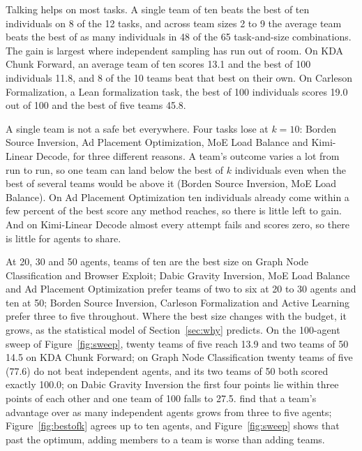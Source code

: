 \documentclass[numbers,10pt]{arxiv}
\renewcommand{\paragraph}[1]{\sansbf{#1}}
\begin{document}
Talking helps on most tasks. A single team of ten beats the best of ten individuals on 8 of the 12 tasks, and across team sizes 2 to 9 the average team beats the best of as many individuals in 48 of the 65 task-and-size combinations. The gain is largest where independent sampling has run out of room. On KDA Chunk Forward, an average team of ten scores 13.1 and the best of 100 individuals 11.8, and 8 of the 10 teams beat that best on their own. On Carleson Formalization, a Lean formalization task, the best of 100 individuals scores 19.0 out of 100 and the best of five teams 45.8.

A single team is not a safe bet everywhere. Four tasks lose at $k=10$: Borden Source Inversion, Ad Placement Optimization, MoE Load Balance and Kimi-Linear Decode, for three different reasons. A team's outcome varies a lot from run to run, so one team can land below the best of $k$ individuals even when the best of several teams would be above it (Borden Source Inversion, MoE Load Balance). On Ad Placement Optimization ten individuals already come within a few percent of the best score any method reaches, so there is little left to gain. And on Kimi-Linear Decode almost every attempt fails and scores zero, so there is little for agents to share.

\begin{table}[htbp]
\caption{One team of ten against the expected best of ten independent agents, and the expected best of five and ten teams of ten against the expected best of 50 and 100 independent agents, on all 12 tasks (Qwen3.8-27B, 12\,h per agent). Team size is $k=10$ throughout. The winner of each pair is bold.}
\label{tab:k10}
\centering\footnotesize

\end{table}

\paragraph{Team size at smaller budgets.} At 20, 30 and 50 agents, teams of ten are the best size on Graph Node Classification and Browser Exploit; Dabic Gravity Inversion, MoE Load Balance and Ad Placement Optimization prefer teams of two to six at 20 to 30 agents and ten at 50; Borden Source Inversion, Carleson Formalization and Active Learning prefer three to five throughout. Where the best size changes with the budget, it grows, as the statistical model of Section~\ref{sec:why} predicts. On the 100-agent sweep of Figure~\ref{fig:sweep}, twenty teams of five reach 13.9 and two teams of 50 14.5 on KDA Chunk Forward; on Graph Node Classification twenty teams of five (77.6) do not beat independent agents, and its two teams of 50 both scored exactly 100.0; on Dabic Gravity Inversion the first four points lie within three points of each other and one team of 100 falls to 27.5. \citet{park2026communication} find that a team's advantage over as many independent agents grows from three to five agents; Figure~\ref{fig:bestofk} agrees up to ten agents, and Figure~\ref{fig:sweep} shows that past the optimum, adding members to a team is worse than adding teams.
\end{document}
